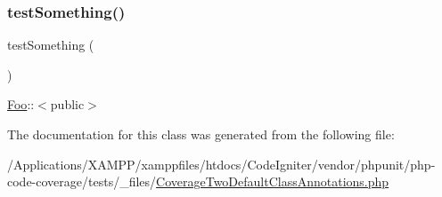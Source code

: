 \subsubsection{\texorpdfstring{test\+Something()}{testSomething()}\hspace{0.1cm}{\footnotesize\ttfamily [2/2]}}
{\footnotesize\ttfamily test\+Something (\begin{DoxyParamCaption}{ }\end{DoxyParamCaption})}

\mbox{\hyperlink{class_foo}{Foo}}\+:\+:$<$public$>$ 

The documentation for this class was generated from the following file\+:\begin{DoxyCompactItemize}
\item 
/\+Applications/\+X\+A\+M\+P\+P/xamppfiles/htdocs/\+Code\+Igniter/vendor/phpunit/php-\/code-\/coverage/tests/\+\_\+files/\mbox{\hyperlink{php-code-coverage_2tests_2__files_2_coverage_two_default_class_annotations_8php}{Coverage\+Two\+Default\+Class\+Annotations.\+php}}\end{DoxyCompactItemize}
